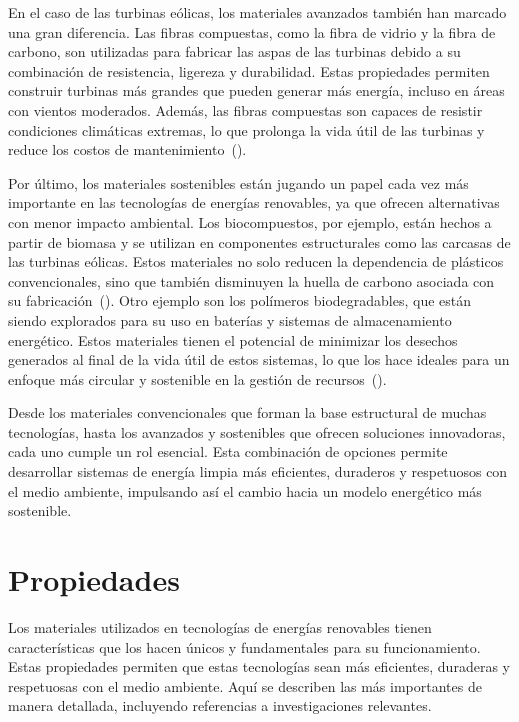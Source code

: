 \documentclass[letterpaper, 12pt]{article}
\begin{document}
En el caso de las turbinas eólicas, los materiales avanzados también han
marcado una gran diferencia. Las fibras compuestas, como la fibra de vidrio y
la fibra de carbono, son utilizadas para fabricar las aspas de las turbinas
debido a su combinación de resistencia, ligereza y durabilidad. Estas
propiedades permiten construir turbinas más grandes que pueden generar más
energía, incluso en áreas con vientos moderados. Además, las fibras compuestas
son capaces de resistir condiciones climáticas extremas, lo que prolonga la
vida útil de las turbinas y reduce los costos de
mantenimiento~(\cite{Galembeck2019}).

Por último, los materiales sostenibles están jugando un papel cada vez más
importante en las tecnologías de energías renovables, ya que ofrecen
alternativas con menor impacto ambiental. Los biocompuestos, por ejemplo, están
hechos a partir de biomasa y se utilizan en componentes estructurales como las
carcasas de las turbinas eólicas. Estos materiales no solo reducen la
dependencia de plásticos convencionales, sino que también disminuyen la huella
de carbono asociada con su fabricación~(\cite{Henriksson2021}). Otro ejemplo
son los polímeros biodegradables, que están siendo explorados para su uso en
baterías y sistemas de almacenamiento energético. Estos materiales tienen el
potencial de minimizar los desechos generados al final de la vida útil de estos
sistemas, lo que los hace ideales para un enfoque más circular y sostenible en
la gestión de recursos~(\cite{Galembeck2019}).

Desde los materiales convencionales que forman la base estructural de muchas
tecnologías, hasta los avanzados y sostenibles que ofrecen soluciones
innovadoras, cada uno cumple un rol esencial. Esta combinación de opciones
permite desarrollar sistemas de energía limpia más eficientes, duraderos y
respetuosos con el medio ambiente, impulsando así el cambio hacia un modelo
energético más sostenible.

\section{Propiedades}

Los materiales utilizados en tecnologías de energías renovables tienen
características que los hacen únicos y fundamentales para su funcionamiento.
Estas propiedades permiten que estas tecnologías sean más eficientes, duraderas
y respetuosas con el medio ambiente. Aquí se describen las más importantes de
manera detallada, incluyendo referencias a investigaciones relevantes.
\end{document}
